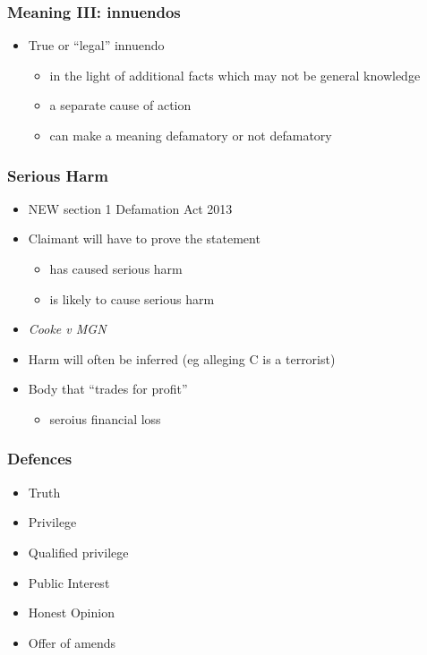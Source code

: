 \documentclass[ignorenonframetext,]{beamer}
\begin{document}
\begin{frame}
\frametitle{Meaning III: innuendos}

\begin{itemize}
\item  True or ``legal'' innuendo

  \begin{itemize}
  \item in the light of additional facts which may not be general knowledge
  \item a separate cause of action
  \item can make a meaning defamatory or not defamatory
  \end{itemize}
\end{itemize}
\end{frame}

\begin{frame}
  \frametitle{Serious Harm}
  \begin{itemize}
  \item NEW section 1 Defamation Act 2013
  \item Claimant will have to prove the statement
    \begin{itemize}
    \item has caused serious harm
    \item is likely to cause serious harm
    \end{itemize}
  \item {\it Cooke v MGN}
  \item Harm will often be inferred (eg alleging C is a terrorist)
  \item Body that ``trades for profit''
    \begin{itemize}
    \item seroius financial loss
    \end{itemize}
  \end{itemize}
\end{frame}

\begin{frame}
\frametitle{Defences}

\begin{itemize}
\item  Truth
\item  Privilege
\item  Qualified privilege
\item  Public Interest
\item  Honest Opinion
\item  Offer of amends
\end{itemize}
\end{frame}
\end{document}
